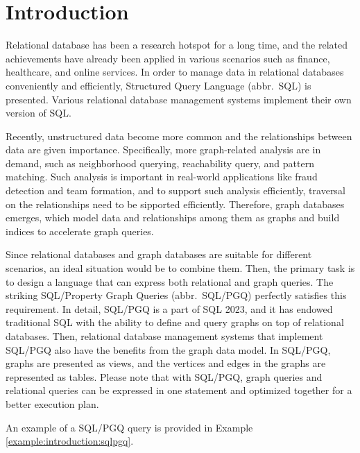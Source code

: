 \section{Introduction}

Relational database has been a research hotspot for a long time, and the related achievements have already been applied in various scenarios such as finance, healthcare, and online services.
In order to manage data in relational databases conveniently and efficiently, Structured Query Language (abbr.~SQL) is presented.
Various relational database management systems implement their own version of SQL.

Recently, unstructured data become more common and the relationships between data are given importance.
Specifically, more graph-related analysis are in demand, such as neighborhood querying, reachability query, and pattern matching.
Such analysis is important in real-world applications like fraud detection and team formation, and to support such analysis efficiently, traversal on the relationships need to be sipported efficiently.
Therefore, graph databases emerges, which model data and relationships among them as graphs and build indices to accelerate graph queries.

Since relational databases and graph databases are suitable for different scenarios, an ideal situation would be to combine them.
Then, the primary task is to design a language that can express both relational and graph queries.
The striking SQL/Property Graph Queries (abbr.~SQL/PGQ) perfectly satisfies this requirement.
In detail, SQL/PGQ is a part of SQL 2023, and it has endowed traditional SQL with the ability to define and query graphs on top of relational databases.
Then, relational database management systems that implement SQL/PGQ also have the benefits from the graph data model.
In SQL/PGQ, graphs are presented as views, and the vertices and edges in the graphs are represented as tables.
Please note that with SQL/PGQ, graph queries and relational queries can be expressed in one statement and optimized together for a better execution plan.

An example of a SQL/PGQ query is provided in Example \ref{example:introduction:sqlpgq}.


